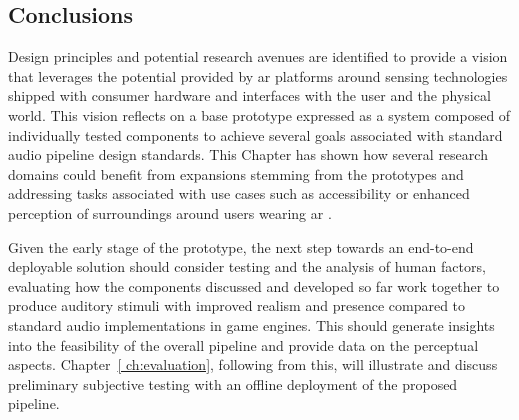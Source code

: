 \subsection{Conclusions}
Design principles and potential research avenues are identified to provide a vision that leverages the potential provided by \acrshort{ar} platforms around sensing technologies shipped with consumer hardware and interfaces with the user and the physical world. This vision reflects on a base prototype expressed as a system composed of individually tested components to achieve several goals associated with standard audio pipeline design standards. This Chapter has shown how several research domains could benefit from expansions stemming from the prototypes and addressing tasks associated with use cases such as accessibility or enhanced perception of surroundings around users wearing \acrshort{ar} .\par
Given the early stage of the prototype, the next step towards an end-to-end deployable solution should consider testing and the analysis of human factors, evaluating how the components discussed and developed so far work together to produce auditory stimuli with improved realism and presence compared to standard audio implementations in game engines. This should generate insights into the feasibility of the overall pipeline and provide data on the perceptual aspects. Chapter~\ref{ ch:evaluation}, following from this, will illustrate and discuss preliminary subjective testing with an offline deployment of the proposed pipeline.
